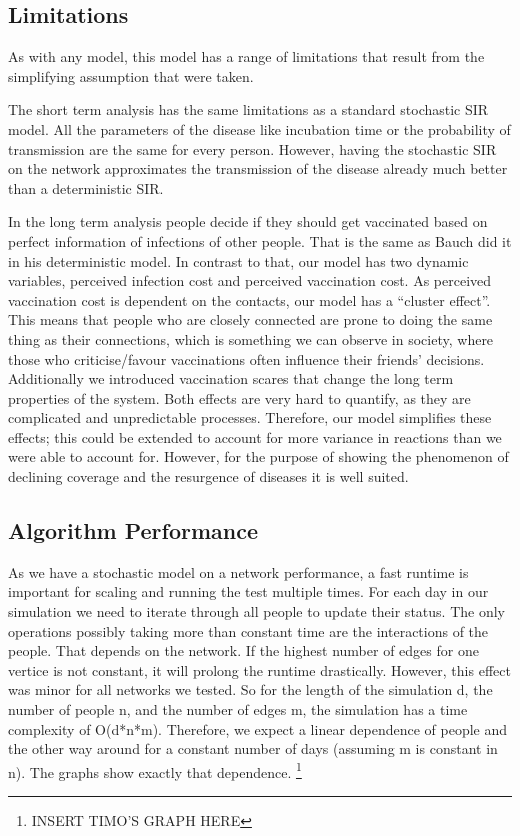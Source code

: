 \documentclass[11pt]{article}
\begin{document}
\subsection{Limitations}
As with any model, this model has a range of limitations that result from the simplifying assumption that were taken.

The short term analysis has the same limitations as a standard stochastic SIR model. All the parameters of the disease like incubation time or the probability of transmission are the same for every person. However, having the stochastic SIR on the network approximates the transmission of the disease already much better than a deterministic SIR.

In the long term analysis people decide if they should get vaccinated based on perfect information of infections of other people. That is the same as Bauch did it in his deterministic model. In contrast to that, our model has two dynamic variables, perceived infection cost and perceived vaccination cost. As perceived vaccination cost is dependent on the contacts, our model has a “cluster effect”. This means that people who are closely connected are prone to doing the same thing as their connections, which is something we can observe in society, where those who criticise/favour vaccinations often influence their friends' decisions. Additionally we introduced vaccination scares that change the long term properties of the system. Both effects are very hard to quantify, as they are complicated and unpredictable processes. Therefore, our model simplifies these effects; this could be extended to account for more variance in reactions than we were able to account for. However, for the purpose of showing the phenomenon of declining coverage and the resurgence of diseases it is well suited. 
 

\subsection{Algorithm Performance}
As we have a stochastic model on a network performance, a fast runtime is important for scaling and running the test multiple times. For each day in our simulation we need to iterate through all people to update their status. The only operations possibly taking more than constant time are the interactions of the people. That depends on the network. If the highest number of edges for one vertice is not constant, it will prolong the runtime drastically. However, this effect was minor for all networks we tested. So for the length of the simulation d, the number of people n, and the number of edges m, the simulation has a time complexity of O(d*n*m). Therefore, we expect a linear dependence of people and the other way around for a constant number of days (assuming m is constant in n). The graphs show exactly that dependence. \footnote{INSERT TIMO'S GRAPH HERE}
\end{document}
